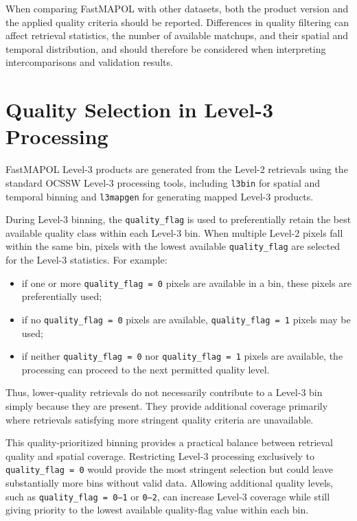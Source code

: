 \documentclass[
  11pt,
  letterpaper,
]{scrreprt}
\providecommand{\tightlist}{%
  \setlength{\itemsep}{0pt}\setlength{\parskip}{0pt}}
\begin{document}
When comparing FastMAPOL with other datasets, both the product version
and the applied quality criteria should be reported. Differences in
quality filtering can affect retrieval statistics, the number of
available matchups, and their spatial and temporal distribution, and
should therefore be considered when interpreting intercomparisons and
validation results.

\section{Quality Selection in Level-3
Processing}\label{quality-selection-in-level-3-processing}

FastMAPOL Level-3 products are generated from the Level-2 retrievals
using the standard OCSSW Level-3 processing tools, including
\texttt{l3bin} for spatial and temporal binning and \texttt{l3mapgen}
for generating mapped Level-3 products.

During Level-3 binning, the \texttt{quality\_flag} is used to
preferentially retain the best available quality class within each
Level-3 bin. When multiple Level-2 pixels fall within the same bin,
pixels with the lowest available \texttt{quality\_flag} are selected for
the Level-3 statistics. For example:

\begin{itemize}
\tightlist
\item
  if one or more \texttt{quality\_flag\ =\ 0} pixels are available in a
  bin, these pixels are preferentially used;
\item
  if no \texttt{quality\_flag\ =\ 0} pixels are available,
  \texttt{quality\_flag\ =\ 1} pixels may be used;
\item
  if neither \texttt{quality\_flag\ =\ 0} nor
  \texttt{quality\_flag\ =\ 1} pixels are available, the processing can
  proceed to the next permitted quality level.
\end{itemize}

Thus, lower-quality retrievals do not necessarily contribute to a
Level-3 bin simply because they are present. They provide additional
coverage primarily where retrievals satisfying more stringent quality
criteria are unavailable.

This quality-prioritized binning provides a practical balance between
retrieval quality and spatial coverage. Restricting Level-3 processing
exclusively to \texttt{quality\_flag\ =\ 0} would provide the most
stringent selection but could leave substantially more bins without
valid data. Allowing additional quality levels, such as
\texttt{quality\_flag\ =\ 0–1} or \texttt{0–2}, can increase Level-3
coverage while still giving priority to the lowest available
quality-flag value within each bin.
\end{document}
